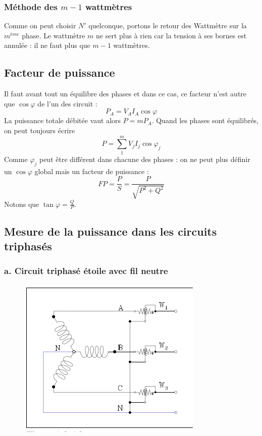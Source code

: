 		\subsubsection{Méthode des $m-1$ wattmètres}
		Comme on peut choisir $N'$ quelconque, portons le retour des Wattmètre 
		sur la $m^{ème}$ phase. Le wattmètre $m$ ne sert plus à rien car la 
		tension à ses bornes est annulée : il ne faut plus que $m-1$ wattmètres.
		
	\subsection{Facteur de puissance}
	Il faut avant tout un équilibre des phases et dans ce cas, ce facteur n'est 
	autre que $\cos\varphi$ de l'un des circuit : 
	\begin{equation}
	P_A = V_AI_A\cos\varphi
	\end{equation}
	La puissance totale débitée vaut alors $P = mP_A$. Quand les phases sont 
	équilibrés, on peut toujours écrire
	\begin{equation}
	P = \sum_1^m V_jI_j\cos\varphi_j
	\end{equation}
	Comme $\varphi_j$ peut être différent dans chacune des phases : on ne peut 
	plus définir un $\cos\varphi$ global mais un facteur de puissance :
	\begin{equation}
	FP = \frac{P}{S} = \frac{P}{\sqrt{P^2+Q^2}}
	\end{equation}
	Notons que $\tan\varphi = \frac{Q}{P}$.
	
	\subsection{Mesure de la puissance dans les circuits triphasés}
				\subsubsection{a. Circuit triphasé étoile avec fil neutre}
		\begin{figure}
		\vspace{-5mm}
		\includegraphics[scale=0.35]{ch1/image12.png}
		\end{figure}

